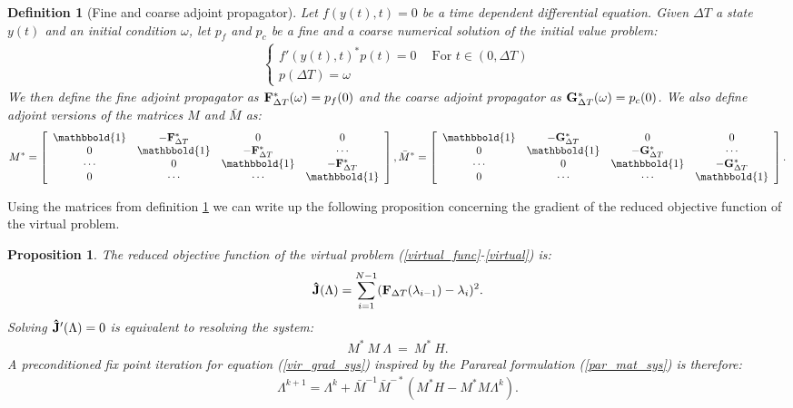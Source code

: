 \documentclass[11pt,a4paper]{article}
\newtheorem{definition}{Definition}
\newtheorem{proposition}{Proposition}
\begin{document}
\begin{definition}[Fine and coarse adjoint propagator] \label{adjoint_prop_def}
Let $f(y(t),t)=0$ be a time dependent differential equation. Given $\Delta T$ a state $y(t)$ and an initial condition $\omega$, let $p_f$ and $p_c$ be a fine and a coarse numerical solution of the initial value problem:
\begin{align}
 \left\{
     \begin{array}{lr}
		f'(y(t),t)^*p(t)=0 \ \quad \textrm{For $t \in (0,\Delta T)$} \\
		p(\Delta T)=\omega
	\end{array}
	\right.	
\end{align}
We then define the fine adjoint propagator as $\bold F_{\Delta T}^*(\omega) = p_f(0)$ and the coarse adjoint propagator as $\bold G_{\Delta T}^*(\omega) = p_c(0)$. We also define adjoint versions of the matrices $M$ and $\bar M$ as: 
\begin{align*}
M^*= \left[ \begin{array}{cccc}
   \mathbbold{1} & -\bold{F}_{\Delta T}^* & 0 & 0 \\  
   0 & \mathbbold{1} & -\bold{F}_{\Delta T}^* & \cdots \\ 
   \cdots &0 &  \mathbbold{1} & -\bold{F}_{\Delta T}^* \\
   0 &\cdots &\cdots &  \mathbbold{1}  \\
   \end{array}  \right],
\bar M^*= \left[ \begin{array}{cccc}
   \mathbbold{1} & -\bold{G}_{\Delta T}^* & 0 & 0 \\  
   0 & \mathbbold{1} & -\bold{G}_{\Delta T}^* & \cdots \\ 
   \cdots &0 &  \mathbbold{1} & -\bold{G}_{\Delta T}^* \\
   0 &\cdots &\cdots &  \mathbbold{1}  \\
   \end{array}  \right].
\end{align*}
\end{definition} 
Using the matrices from definition \ref{adjoint_prop_def} we can write up the following proposition concerning the gradient of the reduced objective function of the virtual problem.
\begin{proposition} \label{vir_grad_prop}
The reduced objective function of the virtual problem (\ref{virtual_func}-\ref{virtual}) is:
\begin{align}
\bold{\hat J}(\Lambda) = \sum_{i=1}^{N-1} (\bold F_{\Delta T}(\lambda_{i-1})-\lambda_{i})^2.\label{reduced_viritual}
\end{align}
Solving $\bold{\hat J}'(\Lambda)=0$ is equivalent to resolving the system:
\begin{align}
M^* \ M \ \Lambda \ = \ M^* \ H. \label{vir_grad_sys}
\end{align}
A preconditioned fix point iteration for equation (\ref{vir_grad_sys}) inspired by the Parareal formulation (\ref{par_mat_sys}) is therefore:
\begin{align}
\Lambda^{k+1} = \Lambda^k + \bar{M}^{-1}\bar M^{-*}(M^*H-M^*M\Lambda^k). \label{grad_fix_iter}
\end{align}
\end{proposition}
\end{document}

